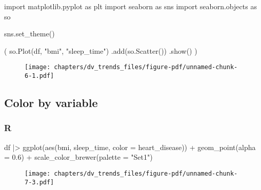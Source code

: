 \documentclass[
  letterpaper,
  DIV=11,
  numbers=noendperiod]{scrreprt}
\newenvironment{Shaded}{\begin{snugshade}}{\end{snugshade}}
\newcommand{\AttributeTok}[1]{\textcolor[rgb]{0.40,0.46,0.14}{#1}}
\newcommand{\FloatTok}[1]{\textcolor[rgb]{0.68,0.00,0.00}{#1}}
\newcommand{\FunctionTok}[1]{\textcolor[rgb]{0.28,0.35,0.67}{#1}}
\newcommand{\ImportTok}[1]{\textcolor[rgb]{0.00,0.46,0.62}{#1}}
\newcommand{\NormalTok}[1]{\textcolor[rgb]{0.00,0.46,0.62}{#1}}
\newcommand{\SpecialCharTok}[1]{\textcolor[rgb]{0.37,0.37,0.37}{#1}}
\newcommand{\StringTok}[1]{\textcolor[rgb]{0.13,0.47,0.30}{#1}}
\begin{document}
\begin{Shaded}
\begin{Highlighting}[]
\ImportTok{import}\NormalTok{ matplotlib.pyplot }\ImportTok{as}\NormalTok{ plt}
\ImportTok{import}\NormalTok{ seaborn }\ImportTok{as}\NormalTok{ sns}
\ImportTok{import}\NormalTok{ seaborn.objects }\ImportTok{as}\NormalTok{ so}

\NormalTok{sns.set\_theme()}

\NormalTok{(}
\NormalTok{    so.Plot(df, }\StringTok{"bmi"}\NormalTok{, }\StringTok{"sleep\_time"}\NormalTok{)}
\NormalTok{    .add(so.Scatter())}
\NormalTok{    .show()}
\NormalTok{)}
\end{Highlighting}
\end{Shaded}

\begin{figure}[H]

{\centering \texttt{[image: chapters/dv\_trends\_files/figure-pdf/unnamed-chunk-6-1.pdf]}

}

\end{figure}

\hypertarget{color-by-variable}{%
\subsection{Color by variable}\label{color-by-variable}}

\hypertarget{r-40}{%
\subsubsection{R}\label{r-40}}

\begin{Shaded}
\begin{Highlighting}[]
\NormalTok{df }\SpecialCharTok{|\textgreater{}} 
    \FunctionTok{ggplot}\NormalTok{(}\FunctionTok{aes}\NormalTok{(bmi, sleep\_time, }\AttributeTok{color =}\NormalTok{ heart\_disease)) }\SpecialCharTok{+}
    \FunctionTok{geom\_point}\NormalTok{(}\AttributeTok{alpha =} \FloatTok{0.6}\NormalTok{) }\SpecialCharTok{+}
    \FunctionTok{scale\_color\_brewer}\NormalTok{(}\AttributeTok{palette =} \StringTok{"Set1"}\NormalTok{)}
\end{Highlighting}
\end{Shaded}

\begin{figure}[H]

{\centering \texttt{[image: chapters/dv\_trends\_files/figure-pdf/unnamed-chunk-7-3.pdf]}

}

\end{figure}
\end{document}
